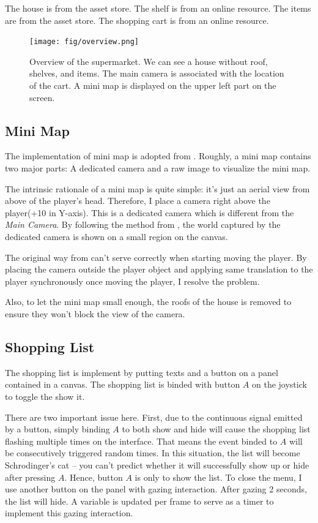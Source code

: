 \documentclass[11pt]{article}
\begin{document}
	The house is from the asset store\cite{houseassets}.
	The shelf is from an online resource\cite{shelfassets}.
	The items are from the asset store\cite{foodassets}.
	The shopping cart is from an online resource\cite{cartassets}.
	
	\begin{figure}[htbp]
		\centering
		\texttt{[image: fig/overview.png]}
		\caption{Overview of the supermarket. We can see a house without roof, shelves, and items. The main camera is associated with the location of the cart. A mini map is displayed on the upper left part on the screen.}
	\end{figure}
	
	
	\subsection{Mini Map}
	The implementation of mini map is adopted from \cite{minimaptutorial}. Roughly, a mini map contains two major parts: A dedicated camera and a raw image to visualize the mini map.
	
	The intrinsic rationale of a mini map is quite simple: it's just an aerial view from above of the player's head. Therefore, I place a camera right above the player(+10 in Y-axis). This is a dedicated camera which is different from the \textit{Main Camera}. By following the method from \cite{minimaptutorial}, the world captured by the dedicated camera is shown on a small region on the canvas.
	
	The original way from \cite{minimaptutorial} can't serve correctly when starting moving the player. By placing the camera outside the player object and applying same translation to the player synchronously once moving the player, I resolve the problem.
	
	Also, to let the mini map small enough, the roofs of the house is removed to ensure they won't block the view of the camera.
	
	\subsection{Shopping List}
	The shopping list is implement by putting texts and a button on a panel contained in a canvas. The shopping list is binded with button $A$ on the joystick to toggle the show it.
	
	There are two important issue here. First, due to the continuous signal emitted by a button, simply binding $A$ to both show and hide will cause the shopping list flashing multiple times on the interface. That means the event binded to $A$ will be consecutively triggered random times. In this situation, the list will become Schrodinger's cat -- you can't predict whether it will successfully show up or hide after pressing $A$. Hence, button $A$ is only to show the list. To close the menu, I use another button on the panel with gazing interaction. After gazing 2 seconds, the list will hide. A variable is updated per frame to serve as a timer to implement this gazing interaction.
	
\end{document}
